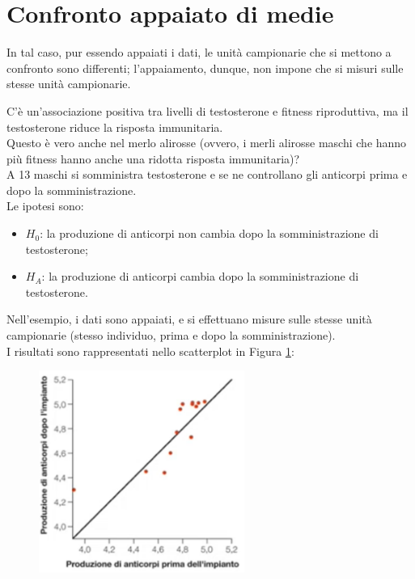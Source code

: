 \documentclass[10pt, draft]{book}
\newcommand{\tightlist}{%
\setlength{\itemsep}{1pt}\setlength{\parskip}{0pt}\setlength{\parsep}{0pt}}
\newcounter{example}[section]
\begin{document}
\section{Confronto appaiato di medie}

In tal caso, pur essendo appaiati i dati, le unità campionarie che si mettono a confronto sono differenti; l'appaiamento, dunque, non impone che si misuri sulle stesse unità campionarie.
\begin{example}\label{esmerlo}
    C'è un'associazione positiva tra livelli di testosterone e fitness riproduttiva, ma il testosterone riduce la risposta immunitaria.
    \\
    Questo è vero anche nel merlo alirosse (ovvero, i merli alirosse maschi che hanno più fitness hanno anche una ridotta risposta immunitaria)?
    \\
    A 13 maschi si somministra testosterone e se ne controllano gli anticorpi prima e dopo la somministrazione.
    \\
    Le ipotesi sono:
    \begin{itemize} \tightlist
        \item $H_0$: la produzione di anticorpi non cambia dopo la somministrazione di testosterone;
        \item $H_A$: la produzione di anticorpi cambia dopo la somministrazione di testosterone.
    \end{itemize}
    Nell'esempio, i dati sono appaiati, e si effettuano misure sulle stesse unità campionarie (stesso individuo, prima e dopo la somministrazione).
    \\
    I risultati sono rappresentati nello scatterplot in Figura \ref{fig12.2-1}:
    \begin{figure}[H]\label{fig12.2-1}
        \centering
        \includegraphics[width=0.6\textwidth]{fig12.2-1}

\end{figure}
\end{example}
\end{document}
